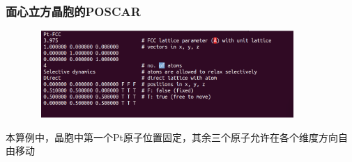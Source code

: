 \frame
{
	\frametitle{面心立方晶胞的\textrm{POSCAR}}
\begin{figure}[h!]
\centering
\includegraphics[height=1.3in,width=4.0in,viewport=0 30 740 270,clip]{Figures/Pt_FCC-POSCAR.png}
\caption{\fontsize{6.2pt}{5.2pt}}%
\label{Pt_FCC:POSCAR}
\end{figure}
本算例中，晶胞中第一个\textrm{Pt}原子位置固定，其余三个原子允许在各个维度方向自由移动\\
{\fontsize{7.0pt}{5.2pt}}
}

